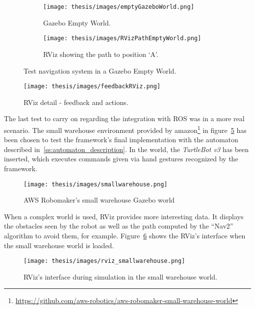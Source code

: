 \documentclass[../thesis.tex]{subfiles}
\begin{document}
\begin{figure}[H]
    \centering
    \begin{subfigure}[b]{0.45\textwidth}
        \centering
        \texttt{[image: thesis/images/emptyGazeboWorld.png]}
        \caption{Gazebo Empty World.}
        \label{fig:gazebo_empty_world}
    \end{subfigure}
    \hfill
    \begin{subfigure}[b]{0.45\textwidth}
        \centering
        \texttt{[image: thesis/images/RVizPathEmptyWorld.png]}
        \caption{RViz showing the path to position `A'.}
        \label{fig:rviz_emptyworld}
    \end{subfigure}
    \caption{Test navigation system in a Gazebo Empty World.}
    \label{fig:system_resource_graphs}
\end{figure}

\begin{figure}[H]
    \centering
    \texttt{[image: thesis/images/feedbackRViz.png]}
    \caption{RViz detail - feedback and actions.}
    \label{fig:rviz_feedback}
\end{figure}

The last test to carry on regarding the integration with \gls{ROS} was in a more real scenario. The small warehouse environment provided by amazon\footnote{\href{https://github.com/aws-robotics/aws-robomaker-small-warehouse-world}{https://github.com/aws-robotics/aws-robomaker-small-warehouse-world}} in figure~\ref{fig:small_warehouse_gazebo_world} has been chosen to test the framework's final implementation with the automaton described in~\ref{ss:automaton_description}. In the world, the \textit{TurtleBot v3} has been inserted, which executes commands given via hand gestures recognized by the framework.

\begin{figure}[H]
    \centering
    \texttt{[image: thesis/images/smallwarehouse.png]}
    \caption{AWS Robomaker's small warehouse Gazebo world}
    \label{fig:small_warehouse_gazebo_world}
\end{figure}

When a complex world is used, RViz provides more interesting data. It displays the obstacles seen by the robot as well as the path computed by the ``Nav2'' algorithm to avoid them, for example. Figure~\ref{fig:rviz_smallwarehouse} shows the RViz's interface when the small warehouse world is loaded.

\begin{figure}[H]
    \centering
    \texttt{[image: thesis/images/rviz\_smallwarehouse.png]}
    \caption{RViz's interface during simulation in the small warehouse world.}
    \label{fig:rviz_smallwarehouse}
\end{figure}
\end{document}
